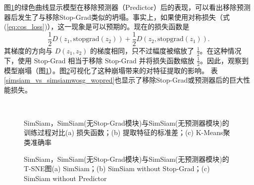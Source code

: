 \documentclass[master]{thesis-uestc}
\begin{document}
图\ref{train_process_simsiam_discuss}的绿色曲线显示模型在移除预测器（Predictor）后的表现，可以看出移除预测器后发生了与移除Stop-Grad类似的坍塌。事实上，如果使用对称损失（式(\ref{eq:cos_loss})），这一现象是可以预期的。现在的损失函数是
\begin{equation}
    \frac{1}{2}D(z_1, \text{stopgrad}(z_2)) + \frac{1}{2}D(z_2, \text{stopgrad}(z_1)).
\end{equation}
其梯度的方向与 $D(z_1, z_2)$ 的梯度相同，只不过幅度被缩放了 $\frac{1}{2}$。在这种情况下，使用 Stop-Grad 相当于移除 Stop-Grad 并将损失函数缩放 $\frac{1}{2}$。因此，观察到模型崩塌（图\ref{train_process_simsiam_discuss}）。图\ref{tsne_simsiam_discuss}可视化了这种崩塌带来的对特征提取的影响。
表\ref{simsiam_vs_simsiamwosg_wopred}也显示了移除Stop-Grad或预测器后的巨大性能损失。
\begin{figure}
    \centering
    \\
    \caption{SimSiam，SimSiam(无Stop-Grad模块)与SimSiam(无预测器模块)的训练过程对比(a) 损失函数；(b) 提取特征的标准差；(c) K-Means聚类准确率}
    \label{train_process_simsiam_discuss}
\end{figure}

\begin{figure}
    \centering
    \caption{SimSiam，SimSiam(无Stop-Grad模块)与SimSiam(无预测器模块)的T-SNE图(a) SimSiam；(b) SimSiam without Stop-Grad；(c) SimSiam without Predictor}
    \label{tsne_simsiam_discuss}
\end{figure}
\end{document}
